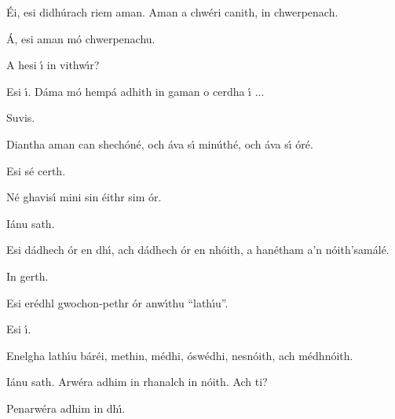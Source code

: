 \begingroup
\fontsize{10pt}{12pt}\selectfont
\begin{leftbubbles}\'{E}i, esi didh\'{u}rach riem aman. Aman a chw\'{e}ri canith, in chwerpenach.\end{leftbubbles}
\begin{rightbubbles}\'{A}, esi aman m\'{o} chwerpenachu.\end{rightbubbles}
\begin{leftbubbles}A hesi \'{\i} in vithw\'{\i}r?\end{leftbubbles}
\begin{rightbubbles}Esi \'{\i}. D\'{a}ma m\'{o} hemp\'{a} adhith in gaman o cerdha \'{\i} ...\end{rightbubbles}
\begin{leftbubbles}Suvis.\end{leftbubbles}
\begin{rightbubbles}Diantha aman can shech\'{o}n\'{e}, och \'{a}va s\'{\i} min\'{u}th\'{e}, och \'{a}va s\'{\i} \'{o}r\'{e}.\end{rightbubbles}
\begin{leftbubbles}Esi s\'{e} certh.\end{leftbubbles}
\begin{rightbubbles}N\'{e} ghavis\'{\i} mini sin \'{e}ithr sim \'{o}r.\end{rightbubbles}
\begin{leftbubbles}I\'{a}nu sath.\end{leftbubbles}
\begin{rightbubbles}Esi d\'{a}dhech \'{o}r en dh\'{\i}, ach d\'{a}dhech \'{o}r en nh\'{o}ith, a han\'{e}tham a’n n\'{o}ith’sam\'{a}l\'{e}.\end{rightbubbles}
\begin{leftbubbles}In gerth.\end{leftbubbles}
\begin{rightbubbles}Esi er\'{e}dhl gwochon-pethr \'{o}r anw\'{\i}thu ``lath\'{\i}u''.\end{rightbubbles}
\begin{leftbubbles}Esi \'{\i}.\end{leftbubbles}
\begin{rightbubbles}Enelgha lath\'{\i}u b\'{a}r\'{e}i, methin, m\'{e}dhi, \'{o}sw\'{e}dhi, nesn\'{o}ith, ach m\'{e}dhn\'{o}ith.\end{rightbubbles}
\begin{leftbubbles}I\'{a}nu sath. Arw\'{e}ra adhim in rhanalch in n\'{o}ith. Ach ti?\end{leftbubbles}
\begin{rightbubbles}Penarw\'{e}ra adhim in dh\'{\i}.\end{rightbubbles}
